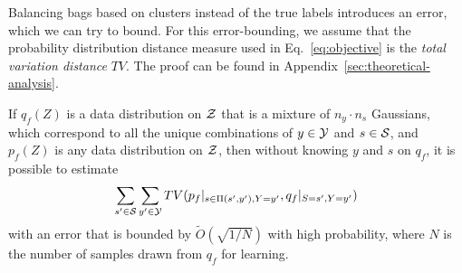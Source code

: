 Balancing bags based on clusters instead of the true labels introduces an error, which we can try
to bound. 
%
For this error-bounding, we assume that the probability distribution distance measure used in
Eq.~\ref{eq:objective} is the \emph{total variation distance} \(TV\). 
%
The proof can be found in Appendix~\ref{sec:theoretical-analysis}.

\begin{theorem}
%
If \(q_f(Z)\) is a data distribution on \({\mathcal{Z}}\) that is a mixture of \(n_y\cdot n_s\) Gaussians,
which correspond to all the unique combinations of \(y\in{\mathcal{Y}}\) and \(s\in{\mathcal{S}}\), and \(p_f(Z)\) is
any data distribution on \({\mathcal{Z}}\), then without knowing \(y\) and \(s\) on \(q_f\), it is possible
to estimate
%
\begin{align}
  \sum\limits_{s^\prime\in{\mathcal{S}}}\sum\limits_{y^\prime\in{\mathcal{Y}}} TV(p_f|_{s\in
  \Pi(s^\prime,y^\prime),Y=y^\prime},
q_f|_{S=s^\prime,Y=y^\prime})
\end{align}
%
with an error that is bounded by \(\tilde{O}(\sqrt{1/N})\) with high probability, where \(N\) is
the number of samples drawn from \(q_f\) for learning.
%
\end{theorem}
%
